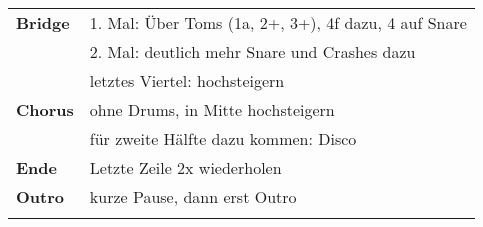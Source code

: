 \begin{tabular}{p{1.6cm}l}
	\textbf{Bridge} & 1. Mal: Über Toms (1a, 2+, 3+), 4f dazu, 4 auf Snare           \\
	                & 2. Mal: deutlich mehr Snare und Crashes dazu                   \\
	                & letztes Viertel: \viertel hochsteigern                         \\
	\textbf{Chorus} & ohne Drums, in Mitte hochsteigern                              \\
	                & für zweite Hälfte dazu kommen: Disco                           \\
	\textbf{Ende}   & Letzte Zeile 2x wiederholen                                    \\
	\textbf{Outro}  & kurze Pause, dann erst Outro                                   \\
	                &                                                                \\
\end{tabular}
